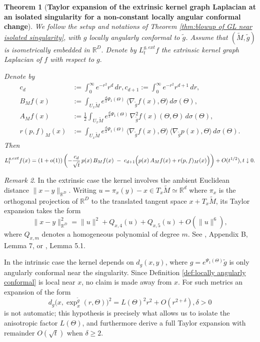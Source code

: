 \documentclass{amsart}
\let\oldcitet\citet
\renewcommand{\citet}[1]{\textcolor{blue}{\oldcitet{#1}}}
\newtheorem{theorem}{Theorem}[section]
\theoremstyle{definition}
\theoremstyle{remark}
\newtheorem{remark}[theorem]{Remark}
\newcommand{\nd}{\noindent}
\newcommand{\Ddim}{\mathbb{R}^D}
\newcommand{\0}{\boldsymbol{0}}
\begin{document}
\begin{theorem}[\textbf{Taylor expansion of the extrinsic kernel graph Laplacian at an isolated singularity for a non-constant locally angular conformal change}]\label{thm:TE extrinsic GL}
    We follow the setup and notations of Theorem \ref{thm:blowup of GL near isolated singularity}, with $g$ locally angularly conformal to $\tilde{g}$. Assume that $(\widetilde{M}, \tilde{g})$ is isometrically embedded in $\Ddim.$ Denote by $L_t^{g, ext}f$ the extrinsic kernel graph Laplacian of $f$ with respect to $g.$ 
    

    
\nd Denote by 
    \begin{align*}
c_d &:= \int_0^\infty e^{-r^2}r^{d}\,dr,
c_{d+1}:= \int_0^\infty e^{-r^2}r^{d+1}\,dr,\\
B_M f(x)
&:= \int_{U_x\widetilde M} e^{\frac{d}{2}\Psi_1(\Theta)}
    \,\langle\nabla_{\tilde{g}} f(x),\Theta\rangle\,d\sigma(\Theta),\\
A_M f(x)
&:= \frac{1}{2}\int_{U_x\widetilde M} e^{\frac{d}{2}\Psi_1(\Theta)}
    \,\nabla^2_{\tilde{g}}{f}(x) (\Theta,\Theta)\,d\sigma(\Theta),\\
    r(p,f)_M(x)&:= \int_{U_x\widetilde M} e^{\frac{d}{2}\Psi_1(\Theta)}
    \,\langle\nabla_{\tilde{g}}  f(x),\Theta\rangle
     \,\langle\nabla_{\tilde{g}}  p(x),\Theta\rangle\,d\sigma(\Theta).
\end{align*}
Then $$L_t^{g, ext}f(x)= (1+o(1))\left(-\frac{c_d}{\sqrt{t}}\,p(x)\,B_M f(x)
   \;-\;c_{d+1}\Bigl(p(x)\,A_M f(x)
                    +r(p,f)_M(x)\Bigr)\right)
   +O(t^{1/2}), t\downarrow 0.$$
\end{theorem}


\begin{remark}
In the extrinsic case the kernel involves the ambient Euclidean distance
$\|x-y\|_{\mathbb{R}^D}$. Writing $u=\pi_x(y)-x\in T_x\widetilde M \simeq \mathbb{R}^d$ where $\pi_x$ is the orthogonal projection of  $\Ddim$ to the translated tangent space $x+T_x\widetilde{M}$, its Taylor expansion takes the form
\[
\|x-y\|_{\mathbb{R}^D}^2
  = \|u\|^2 + Q_{x,4}(u) + Q_{x,5}(u) + O(\|u\|^6),
\]
where $Q_{x,m}$ denotes a homogeneous polynomial of degree $m$. See \citet{CoifmanLafon2006}, Appendix B, Lemma 7, or \citet{PalTewodrose2025}, Lemma 5.1.

In the intrinsic case the kernel depends on $d_g(x,y)$, where $g=e^{\Psi_1(\Theta)}\tilde g$ is only angularly conformal near the singularity. Since Definition \ref{def:locally angularly conformal} is local near $x$, no claim is made away from $x$.
For such metrics an expansion of the form
\[
d_g\bigl(x,\exp_x^{\tilde g}(r,\Theta)\bigr)^2
  = L(\Theta)^2 r^2 + O(r^{2+\delta}), \delta > 0
\]
is not automatic; this hypothesis is precisely what allows us to isolate the
anisotropic factor $L(\Theta)$, and furthermore 
derive a full Taylor expansion with remainder
$O(\sqrt t)$ when $\delta \ge 2.$ 
\end{remark}
\end{document}
